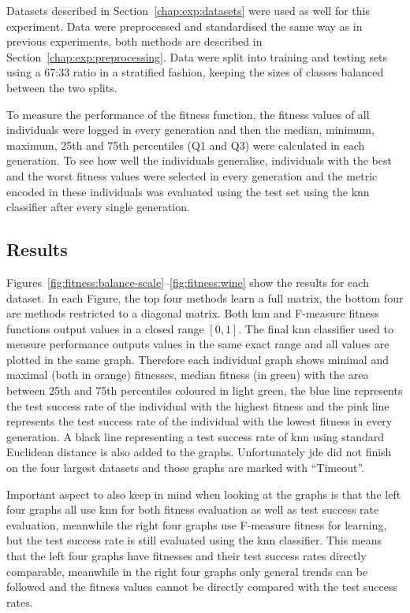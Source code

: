 \documentclass[12pt,a4paper]{report}
\begin{document}
Datasets described in Section~\ref{chap:exp:datasets} were used as well for this experiment. Data were preprocessed and standardised the same way as in previous experiments, both methods are described in Section~\ref{chap:exp:preprocessing}. Data were split into training and testing sets using a 67:33 ratio in a stratified fashion, keeping the sizes of classes balanced between the two splits.

To measure the performance of the fitness function, the fitness values of all individuals were logged in every generation and then the median, minimum, maximum, 25th and 75th percentiles (Q1 and Q3) were calculated in each generation. To see how well the individuals generalise, individuals with the best and the worst fitness values were selected in every generation and the metric encoded in these individuals was evaluated using the test set using the \ac{knn} classifier after every single generation.

\subsection{Results}

Figures~\ref{fig:fitness:balance-scale}--\ref{fig:fitness:wine} show the results for each dataset. In each Figure, the top four methods learn a full matrix, the bottom four are methods restricted to a diagonal matrix. Both \ac{knn} and F-measure fitness functions output values in a closed range $[0,1]$. The final \ac{knn} classifier used to measure performance outputs values in the same exact range and all values are plotted in the same graph. Therefore each individual graph shows minimal and maximal (both in orange) fitnesses, median fitness (in green) with the area between 25th and 75th percentiles coloured in light green, the blue line represents the test success rate of the individual with the highest fitness and the pink line represents the test success rate of the individual with the lowest fitness in every generation. A black line representing a test success rate of \ac{knn} using standard Euclidean distance is also added to the graphs. Unfortunately \ac{jde} did not finish on the four largest datasets and those graphs are marked with ``Timeout''.

Important aspect to also keep in mind when looking at the graphs is that the left four graphs all use \ac{knn} for both fitness evaluation as well as test success rate evaluation, meanwhile the right four graphs use F-measure fitness for learning, but the test success rate is still evaluated using the \ac{knn} classifier. This means that the left four graphs have fitnesses and their test success rates directly comparable, meanwhile in the right four graphs only general trends can be followed and the fitness values cannot be directly compared with the test success rates.
\end{document}

